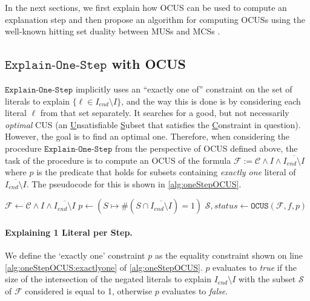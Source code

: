 \documentclass[twoside,11pt]{article}
\newcommand\m[1]{\mathcal{#1}}
\newcommand\Iend{\ensuremath{I_\mathit{end} }\xspace}
\newcommand\formula{\ensuremath{\m{F} }\xspace}
\newcommand\formulac{\ensuremath{\m{C} }\xspace}
\newcommand\mm[1]{\ensuremath{#1}\xspace}
\newcommand\call[1]{\mm{\texttt{#1}}}
\newcommand\onestep{\ensuremath{\call{Explain-One-Step}}\xspace}
\newcommand\onestepo{\ensuremath{\call{Explain-One-Step-OCUS}}\xspace}
\begin{document}
In the next sections, we first explain how OCUS can be used to compute an explanation step and then propose an algorithm for computing OCUSs using the well-known hitting set duality between MUSs and MCSs \cite{DBLP:journals/jar/LiffitonS08,ai/Reiter87}.

\subsection{\onestep with OCUS}

\onestep implicitly uses an ``exactly one of'' constraint on the set of literals to explain $ \{\ell \in \Iend \setminus I\}$, and the way this is done is by considering each literal $\ell$ from that set separately. It searches for a good, but not necessarily \emph{optimal} CUS (an \underline{U}nsatisfiable \underline{S}ubset that satisfies the \underline{C}onstraint in question). However, the goal is to find an optimal one.
Therefore, when considering the procedure \onestep from the perspective of OCUS defined above, the task of the procedure is to compute an OCUS of the formula $\formula := \formulac\land I\land \overline{\Iend\setminus I}$ where $p$ is the predicate that holds for subsets containing \emph{exactly one} literal of $\overline{\Iend\setminus I}$. 
The pseudocode for this is shown in \cref{alg:oneStepOCUS}.

\begin{algorithm}[!h]
	\DontPrintSemicolon
	
	\caption{$\onestepo(\formulac,f,I,\Iend)$}
	\label{alg:oneStepOCUS}
$\formula \gets \formulac\land I\land \overline{\Iend\setminus I}$\;
$p \gets (S\mapsto \# (S\cap \overline{\Iend\setminus  I})=1)$\label{alg:oneStepOCUS:exactlyone}\;
$\m{S} , \mathit{status} \gets \call{OCUS}(\formula, f, p)$\label{alg:oneStepOCUS:ocus-call}\;
\lIf{$\mathit{status} \neq \mathit{FAILURE}$}{\Return{$\m{S}$} }
\lElse{\Return{$\emptyset$}}
\end{algorithm}

\paragraph{Explaining 1 Literal per Step.} We define the `exactly one' constraint $p$ as the equality constraint shown on line \ref{alg:oneStepOCUS:exactlyone} of \cref{alg:oneStepOCUS}. $p$ evaluates to \textit{true} if the size of the intersection of the negated literals to explain $\Iend\setminus I$ with the subset $\m{S}$ of $\formula$ considered is equal to 1, otherwise $p$ evaluates to \textit{false}. 
\end{document}
